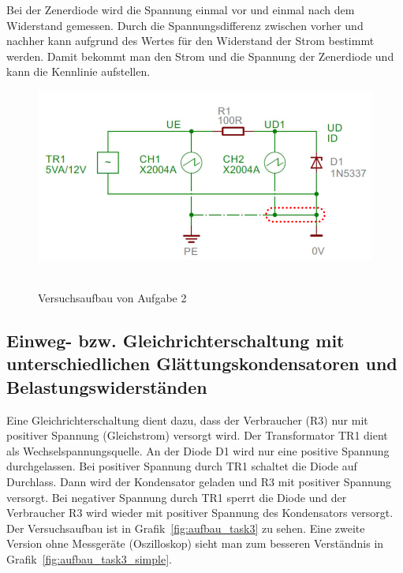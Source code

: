 \documentclass{article}
\begin{document}
Bei der Zenerdiode wird die Spannung einmal vor und einmal nach dem Widerstand gemessen. Durch die Spannungsdifferenz zwischen vorher und nachher kann aufgrund des Wertes für den Widerstand der Strom bestimmt werden. Damit bekommt man den Strom und die Spannung der Zenerdiode und kann die Kennlinie aufstellen.

\begin{figure}[H]
\caption{Versuchsaufbau von Aufgabe 2}
\label{fig:aufbau_task2}
{\centering
\includegraphics[scale=1.7]{bilder/aufbau_task2.png}
~
}
\end{figure}



\subsection{Einweg- bzw. Gleichrichterschaltung mit unterschiedlichen Glättungskondensatoren und Belastungswiderständen}

Eine Gleichrichterschaltung dient dazu, dass der Verbraucher (R3) nur mit positiver Spannung (Gleichstrom) versorgt wird. Der Transformator TR1 dient als Wechselspannungsquelle. An der Diode D1 wird nur eine positive Spannung durchgelassen. Bei positiver Spannung durch TR1 schaltet die Diode auf Durchlass. Dann wird der Kondensator geladen und R3 mit positiver Spannung versorgt. Bei negativer Spannung durch TR1 sperrt die Diode und der Verbraucher R3 wird wieder mit positiver Spannung des Kondensators versorgt. Der Versuchsaufbau ist in Grafik~\ref{fig:aufbau_task3} zu sehen. Eine zweite Version ohne Messgeräte (Oszilloskop) sieht man zum besseren Verständnis in Grafik~\ref{fig:aufbau_task3_simple}.
\end{document}
